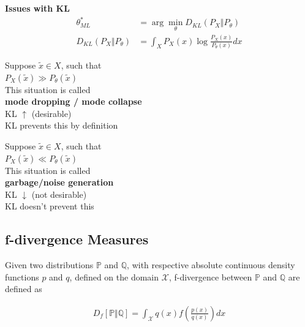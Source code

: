 \documentclass[11pt]{article}
\begin{document}
\begin{framed}
  \textbf{Issues with KL}
  \begin{align*}
    \theta_{ML}^{*} &= \arg\min_{\theta} D_{KL}\left( P_X \Vert P_{\theta}  \right) \\
    D_{KL}\left( P_X \Vert P_{\theta} \right) &= \int_X P_X(x) \log \frac{P_X(x)}{P_{\theta}(x)} dx
  \end{align*}

  \begin{minipage}{0.5\textwidth}
    \begin{framed}
      \centering
      Suppose $\tilde{x} \in X$, such that \\
      $P_X(\tilde{x}) \gg P_{\theta}(\tilde{x})$ \\
      This situation is called \\ \textbf{mode dropping / mode collapse} \\
      KL $\uparrow$ (desirable) \\
      KL prevents this by definition
    \end{framed}
  \end{minipage}
  \begin{minipage}{0.5\textwidth}
    \begin{framed}
      \centering
      Suppose $\tilde{x} \in X$, such that \\
      $P_X(\tilde{x}) \ll P_{\theta}(\tilde{x})$ \\
      This situation is called \\ \textbf{garbage/noise generation} \\
      KL $\downarrow$ (not desirable) \\
      KL doesn't prevent this
    \end{framed}
  \end{minipage}
\end{framed}

\subsection{f-divergence Measures}
\label{sec:f-diverg-meas}

Given two distributions $\mathbb{P}$ and $\mathbb{Q}$, with respective absolute continuous density functions $p$ and $q$, defined on the domain $\mathcal{X}$, f-divergence between $\mathbb{P}$ and $\mathbb{Q}$ are defined as 

\begin{align*}
  D_f \left[ \mathbb{P} \Vert \mathbb{Q} \right] = \int_{\mathcal{X}} q(x) f\left( \frac{p(x)}{q(x)} \right)dx
\end{align*}
\end{document}
